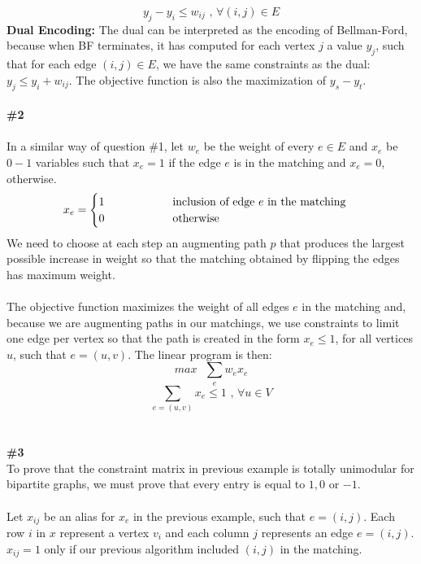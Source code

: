 \documentclass{article}
\newcommand\tab[1][1cm]{\hspace*{#1}}
\begin{document}
$$
y_j - y_i \leq w_{ij} \text{ , } \forall (i,j) \in E
$$
\textbf{Dual Encoding:}
The dual can be interpreted as the encoding of Bellman-Ford, because when BF terminates, it has computed for each vertex $j$ a value $y_j$, such that for each edge $(i,j) \in E$, we have the same constraints as the dual: $y_j \leq y_i + w_{ij}$. The objective function is also the maximization of $y_s - y_t$.
\\
\\
\textbf{\#2}
\\
\\
In a similar way of question \#1, let $w_e$ be the weight of every $e \in E$ and $x_e$ be $0-1$ variables such that $x_e = 1$ if the edge $e$ is in the matching and $x_e = 0$, otherwise. 
\begin{gather*}
x_e =
\begin{cases}
1 \tab\tab\text{ inclusion of edge } e \text{ in the matching} \\
0 \tab\tab\text{ otherwise}\\
\end{cases}
\end{gather*}
We need to choose at each step an augmenting path $p$ that produces the largest possible increase in weight so that the matching obtained by flipping the edges has maximum weight.
\\
\\
The objective function maximizes the weight of all edges $e$ in the matching and, because we are augmenting paths in our matchings, we use constraints to limit one edge per vertex so that the path is created in the form $x_e \leq 1$, for all vertices $u$, such that $e=(u, v)$. The linear program is then:
$$
max \text{ } \sum_e w_e x_e
$$
$$
\sum_{e=(u,v)} x_e \leq 1 \text{ , } \forall u \in V
$$
\\
\\
\textbf{\#3}
\\
To prove that the constraint matrix in previous example is totally unimodular for bipartite graphs, we must prove that every entry is equal to $1, 0$ or $-1$.
\\
\\
Let $x_{ij}$ be an alias for $x_e$ in the previous example, such that $e=(i,j)$. Each row $i$ in $x$ represent a vertex $v_i$ and each column $j$ represents an edge $e=(i, j)$. $x_{ij} = 1$ only if our previous algorithm included $(i, j)$ in the matching.
\\
\\
\end{document}

